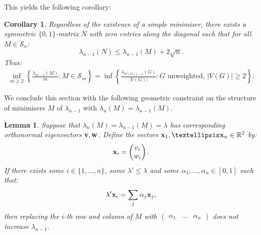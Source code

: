 \documentclass[12pt]{article}
\newtheorem{lmm}[thm]{Lemma}
\newtheorem{cor}[thm]{Corollary}
\begin{document}
This yields the following corollary:
\begin{cor} Regardless of the existence of a simple minimiser, there exists a symmetric $\{0,1\}$-matrix $N$ with zero entries along the diagonal such that for all $M\in \mathcal{S}_n$:
\begin{equation*}
    \lambda_{n-1}(N)\le \lambda_{n-1}(M) + 2\sqrt{n}.
\end{equation*}
Thus:
\begin{align*}
    \inf_{m\ge 2} \left\{\frac{\lambda_{m-1}(M)}{m}:M\in \mathcal{S}_m\right\} = \inf  \left\{\frac{\lambda_{|V(G)|-1}(G)}{|V(G)|}: G \text{ unweighted, } |V(G)|\ge 2\right\}.
\end{align*}
\end{cor}
We conclude this section with the following geometric constraint on the structure of minimisers $M$ of $\lambda_{n-1}$ with $\lambda_{n}(M) = \lambda_{n-1}(M)$. 
\begin{lmm} Suppose that $\lambda_{n}(M) = \lambda_{n-1}(M)=\lambda$ has corresponding orthonormal eigenvectors $\bold{v,w}$. Define the vectors $\bold{x}_1,\dots \bold{x}_n \in \mathbb{R}^2$ by:
\begin{equation*}
    \bold{x}_i = \begin{pmatrix}
        v_i \\ w_i
    \end{pmatrix}.
\end{equation*}
If there exists some $i\in \{1,\dots , n\}$, some $\lambda' \le \lambda$ and some $\alpha_1,\dots,\alpha_n \in [0,1]$ such that:
\begin{equation*}
    \lambda' \bold{x}_i = \sum_{j} \alpha_{j} \bold{x}_j,
\end{equation*}
then replacing the $i$-th row and column of $M$ with $\begin{pmatrix}\alpha_1 & \dots & \alpha_n \end{pmatrix}$ does not increase $\lambda_{n-1}$. 
\end{lmm}
\end{document}
